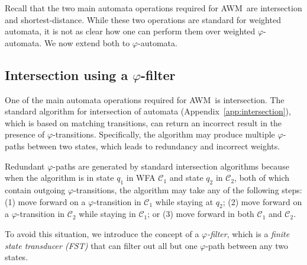 \documentclass{article}
\newcommand{\sC}{\mathscr C}
\renewcommand{\phi}{\varphi}
\newcommand{\AWM}{\textsc{AWM}}
\begin{document}
Recall that the two main automata operations required for \AWM\ are
intersection and shortest-distance. While these two operations 
are standard for weighted automata, it is not as clear how one can
perform them over weighted $\phi$-automata. We now extend both to
$\phi$-automata.

\subsection{Intersection using a $\phi$-filter}

One of the main automata operations required for \AWM\ is
intersection.  The standard algorithm for intersection of automata
(Appendix~\ref{app:intersection}), which is based on matching
transitions, can return an incorrect result in the presence of
$\phi$-transitions.  Specifically, the algorithm may produce multiple
$\phi$-paths between two states, which leads to redundancy and 
incorrect weights.




Redundant $\phi$-paths are generated by standard intersection
algorithms because when the algorithm is in state $q_1$ in WFA $\sC_1$ and
state $q_2$ in $\sC_2$, both of which contain outgoing
$\phi$-transitions, the algorithm may take any of the following steps:
(1) move forward on a $\phi$-transition in $\sC_1$ while staying at
$q_2$; (2) move forward on a $\phi$-transition in $\sC_2$
while staying in $\sC_1$; or (3) move forward in both $\sC_1$ and
$\sC_2$.

To avoid this situation, we introduce the concept of a \emph{$\phi$-filter},
which is a \emph{finite state transducer (FST)} that can filter out all but 
one $\phi$-path between
any two states. 
\end{document}
